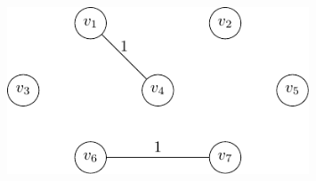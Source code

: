 \begin{minipage}{0.25\textwidth}
\begin{figure}[H]
  \centering
  \includegraphics[width=0.8\textwidth]{Figure/Kruskal_algo_d3.pdf}
\end{figure}
\end{minipage}

